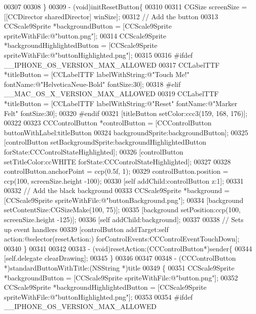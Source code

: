 \begin{DoxyCode}
{{{00307 
00308 \}
00309 - (void)initResetButton\{
00310     
00311     CGSize screenSize = [[CCDirector sharedDirector] winSize];
00312     \textcolor{comment}{// Add the button}
00313     CCScale9Sprite *backgroundButton = [CCScale9Sprite spriteWithFile:@"button.png"];
00314     CCScale9Sprite *backgroundHighlightedButton = [CCScale9Sprite spriteWithFile:@"buttonHighlighted.png"];
00315     
00316 \textcolor{preprocessor}{#ifdef \_\_IPHONE\_OS\_VERSION\_MAX\_ALLOWED}
00317 \textcolor{preprocessor}{}    CCLabelTTF *titleButton = [CCLabelTTF labelWithString:@"Touch Me!" fontName:@"HelveticaNeue-Bold" 
      fontSize:30];
00318 \textcolor{preprocessor}{#elif \_\_MAC\_OS\_X\_VERSION\_MAX\_ALLOWED}
00319 \textcolor{preprocessor}{}    CCLabelTTF *titleButton = [CCLabelTTF labelWithString:@"Reset" fontName:@"Marker Felt" fontSize:30];
00320 \textcolor{preprocessor}{#endif}
00321 \textcolor{preprocessor}{}    [titleButton setColor:ccc3(159, 168, 176)];
00322     
00323     CCControlButton *controlButton = [CCControlButton buttonWithLabel:titleButton
00324                                                      backgroundSprite:backgroundButton];
00325     [controlButton setBackgroundSprite:backgroundHighlightedButton forState:CCControlStateHighlighted];
00326     [controlButton setTitleColor:ccWHITE forState:CCControlStateHighlighted];
00327     
00328     controlButton.anchorPoint = ccp(0.5f, 1);
00329     controlButton.position = ccp(100, screenSize.height -100);
00330     [\textcolor{keyword}{self} addChild:controlButton z:1];
00331     
00332     \textcolor{comment}{// Add the black background}
00333     CCScale9Sprite *background = [CCScale9Sprite spriteWithFile:@"buttonBackground.png"];
00334     [background setContentSize:CGSizeMake(100, 75)];
00335     [background setPosition:ccp(100, screenSize.height -125)];
00336     [\textcolor{keyword}{self} addChild:background];
00337     
00338     \textcolor{comment}{// Sets up event handlers}
00339     [controlButton addTarget:self action:@selector(resetAction:) forControlEvents:CCControlEventTouchDown];
00340 \}
00341 
00342 
00343 - (void)resetAction:(CCControlButton*)sender\{
00344     [\textcolor{keyword}{self}.delegate clearDrawing];
00345 \}
00346 
00347 
00348 - (CCControlButton *)standardButtonWithTitle:(NSString *)title
00349 \{
00351     CCScale9Sprite *backgroundButton = [CCScale9Sprite spriteWithFile:@"button.png"];
00352     CCScale9Sprite *backgroundHighlightedButton = [CCScale9Sprite spriteWithFile:@"buttonHighlighted.png"];
00353     
00354 \textcolor{preprocessor}{#ifdef \_\_IPHONE\_OS\_VERSION\_MAX\_ALLOWED}
}}}
\end{DoxyCode}
